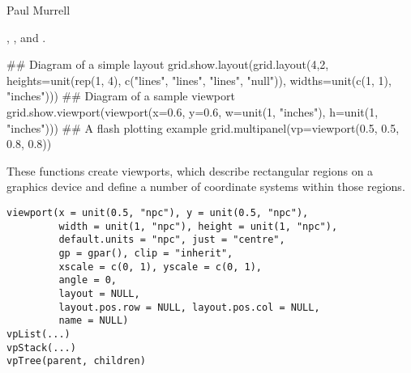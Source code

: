 %
\begin{Author}\relax
Paul Murrell
\end{Author}
%
\begin{SeeAlso}\relax
{},
, and
.
\end{SeeAlso}
%
\begin{Examples}
\begin{ExampleCode}
## Diagram of a simple layout 
grid.show.layout(grid.layout(4,2,
                     heights=unit(rep(1, 4),
                                  c("lines", "lines", "lines", "null")),
                     widths=unit(c(1, 1), "inches")))
## Diagram of a sample viewport
grid.show.viewport(viewport(x=0.6, y=0.6,
                            w=unit(1, "inches"), h=unit(1, "inches")))
## A flash plotting example
grid.multipanel(vp=viewport(0.5, 0.5, 0.8, 0.8))
\end{ExampleCode}
\end{Examples}
%
\begin{Description}\relax
These functions create viewports, which describe rectangular regions
on a graphics device and define a number of coordinate systems within
those regions.
\end{Description}
%
\begin{Usage}
\begin{verbatim}
viewport(x = unit(0.5, "npc"), y = unit(0.5, "npc"),
         width = unit(1, "npc"), height = unit(1, "npc"),
         default.units = "npc", just = "centre", 
         gp = gpar(), clip = "inherit",
         xscale = c(0, 1), yscale = c(0, 1),
         angle = 0,
         layout = NULL,
         layout.pos.row = NULL, layout.pos.col = NULL,
         name = NULL)
vpList(...)
vpStack(...)
vpTree(parent, children)
\end{verbatim}
\end{Usage}
%
